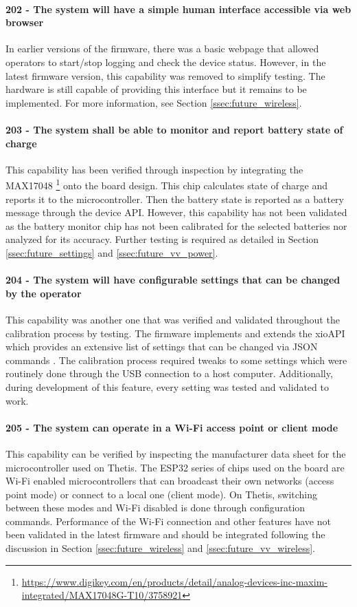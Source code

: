 \paragraph*{202 - The system will have a simple human interface accessible via web browser} In earlier versions of the firmware, there was a basic webpage that allowed operators to start/stop logging and check the device status.
However, in the latest firmware version, this capability was removed to simplify testing.
The hardware is still capable of providing this interface but it remains to be implemented.
For more information, see Section \ref{ssec:future_wireless}.

\paragraph*{203 - The system shall be able to monitor and report battery state of charge} This capability has been verified through inspection by integrating the MAX17048 \footnote{\url{https://www.digikey.com/en/products/detail/analog-devices-inc-maxim-integrated/MAX17048G-T10/3758921}} onto the board design.
This chip calculates state of charge and reports it to the microcontroller.
Then the battery state is reported as a battery message through the device API.
However, this capability has not been validated as the battery monitor chip has not been calibrated for the selected batteries nor analyzed for its accuracy.
Further testing is required as detailed in Section \ref{ssec:future_settings} and \ref{ssec:future_vv_power}.

\paragraph*{204 - The system will have configurable settings that can be changed by the operator} This capability was another one that was verified and validated throughout the calibration process by testing.
The firmware implements and extends the xioAPI which provides an extensive list of settings that can be changed via JSON commands \cite{ThetisUserManual}.
The calibration process required tweaks to some settings which were routinely done through the USB connection to a host computer.
Additionally, during development of this feature, every setting was tested and validated to work.

\paragraph*{205 - The system can operate in a Wi-Fi access point or client mode} This capability can be verified by inspecting the manufacturer data sheet for the microcontroller used on Thetis.
The ESP32 series of chips used on the board are Wi-Fi enabled microcontrollers that can broadcast their own networks (access point mode) or connect to a local one (client mode).
On Thetis, switching between these modes and Wi-Fi disabled is done through configuration commands.
Performance of the Wi-Fi connection and other features have not been validated in the latest firmware and should be integrated following the discussion in Section \ref{ssec:future_wireless} and \ref{ssec:future_vv_wireless}.

